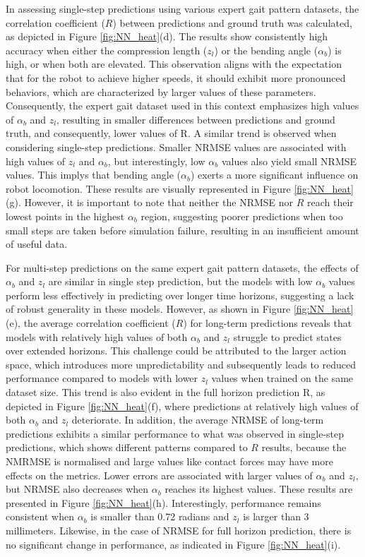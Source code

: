 In assessing single-step predictions using various expert gait pattern datasets, the correlation coefficient ($R$) between predictions and ground truth was calculated, as depicted in Figure \ref{fig:NN_heat}(d). The results show consistently high accuracy when either the compression length ($z_l$) or the bending angle ($\alpha_b$) is high, or when both are elevated. This observation aligns with the expectation that for the robot to achieve higher speeds, it should exhibit more pronounced behaviors, which are characterized by larger values of these parameters. Consequently, the expert gait dataset used in this context emphasizes high values of $\alpha_b$ and $z_l$, resulting in smaller differences between predictions and ground truth, and consequently, lower values of R. A similar trend is observed when considering single-step predictions. Smaller NRMSE values are associated with high values of $z_l$ and $\alpha_b$, but interestingly, low $\alpha_b$ values also yield small NRMSE values. This implys that bending angle ($\alpha_b$) exerts a more significant influence on robot locomotion. These results are visually represented in Figure \ref{fig:NN_heat}(g). However, it is important to note that neither the NRMSE nor $R$ reach their lowest points in the highest $\alpha_b$ region, suggesting poorer predictions when too small steps are taken before simulation failure, resulting in an insufficient amount of useful data.

For multi-step predictions on the same expert gait pattern datasets, the effects of $\alpha_b$ and $z_l$ are similar in single step prediction, but the models with low $\alpha_b$ values perform less effectively in predicting over longer time horizons, suggesting a lack of robust generality in these models. However, as shown in Figure \ref{fig:NN_heat}(e), the average correlation coefficient ($R$) for long-term predictions reveals that models with relatively high values of both $\alpha_b$ and $z_l$ struggle to predict states over extended horizons. This challenge could be attributed to the larger action space, which introduces more unpredictability and subsequently leads to reduced performance compared to models with lower $z_l$ values when trained on the same dataset size. This trend is also evident in the full horizon prediction R, as depicted in Figure \ref{fig:NN_heat}(f), where predictions at relatively high values of both $\alpha_b$ and $z_l$ deteriorate. In addition, the average NRMSE of long-term predictions exhibits a similar performance to what was observed in single-step predictions, which shows different patterns compared to $R$ results, because the NMRMSE is normalised and large values like contact forces may have more effects on the metrics. Lower errors are associated with larger values of $\alpha_b$ and $z_l$, but NRMSE also decreases when $\alpha_b$ reaches its highest values. These results are presented in Figure \ref{fig:NN_heat}(h). Interestingly, performance remains consistent when $\alpha_b$ is smaller than 0.72 radians and $z_l$ is larger than 3 millimeters. Likewise, in the case of NRMSE for full horizon prediction, there is no significant change in performance, as indicated in Figure \ref{fig:NN_heat}(i).


